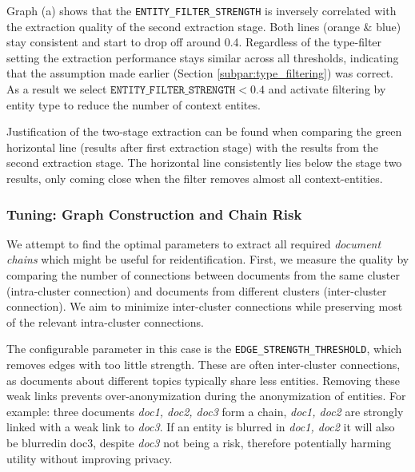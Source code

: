 Graph (a) shows that the \texttt{ENTITY\_FILTER\_STRENGTH} is inversely correlated with the extraction quality of the second extraction stage. Both lines (orange \& blue) stay consistent and start to drop off around 0.4. Regardless of the type-filter setting the extraction performance stays similar across all thresholds, indicating that the assumption made earlier (Section \ref{subpar:type_filtering}) was correct. As a result we select $\texttt{ENTITY\_FILTER\_STRENGTH} < 0.4$ and activate filtering by entity type to reduce the number of context entites.

Justification of the two-stage extraction can be found when comparing the green horizontal line (results after first extraction stage) with the results from the second extraction stage. The horizontal line consistently lies below the stage two results, only coming close when the filter removes almost all context-entities. 

\subsubsection{Tuning: Graph Construction and Chain Risk}
We attempt to find the optimal parameters to extract all required \textit{document chains} which might be useful for reidentification. First, we measure the quality by comparing the number of connections between documents from the same cluster (intra-cluster connection) and documents from different clusters (inter-cluster connection). We aim to minimize inter-cluster connections while preserving most of the relevant intra-cluster connections.

The configurable parameter in this case is the \texttt{EDGE\_STRENGTH\_THRESHOLD}, which removes edges with too little strength. These are often inter-cluster connections, as documents about different topics typically share less entities. Removing these weak links prevents over-anonymization during the anonymization of entities. For example: three documents \textit{doc1, doc2, doc3} form a chain, \textit{doc1, doc2} are strongly linked with a weak link to \textit{doc3}. If an entity is blurred in \textit{doc1, doc2} it will also be blurredin doc3, despite \textit{doc3} not being a risk, therefore potentially harming utility without improving privacy.

